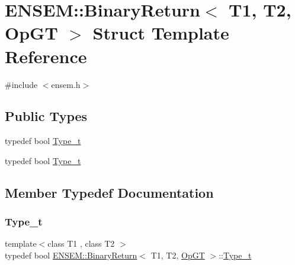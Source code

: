 \hypertarget{structENSEM_1_1BinaryReturn_3_01T1_00_01T2_00_01OpGT_01_4}{}\section{E\+N\+S\+EM\+:\+:Binary\+Return$<$ T1, T2, Op\+GT $>$ Struct Template Reference}
\label{structENSEM_1_1BinaryReturn_3_01T1_00_01T2_00_01OpGT_01_4}


{\ttfamily \#include $<$ensem.\+h$>$}

\subsection*{Public Types}
\begin{DoxyCompactItemize}
\item 
typedef bool \mbox{\hyperlink{structENSEM_1_1BinaryReturn_3_01T1_00_01T2_00_01OpGT_01_4_a421698302c7e07764108c7954de9f1c8}{Type\+\_\+t}}
\item 
typedef bool \mbox{\hyperlink{structENSEM_1_1BinaryReturn_3_01T1_00_01T2_00_01OpGT_01_4_a421698302c7e07764108c7954de9f1c8}{Type\+\_\+t}}
\end{DoxyCompactItemize}


\subsection{Member Typedef Documentation}
\mbox{\label{structENSEM_1_1BinaryReturn_3_01T1_00_01T2_00_01OpGT_01_4_a421698302c7e07764108c7954de9f1c8}} 
\subsubsection{\texorpdfstring{Type\_t}{Type\_t}\hspace{0.1cm}{\footnotesize\ttfamily [1/2]}}
{\footnotesize\ttfamily template$<$class T1 , class T2 $>$ \\
typedef bool \mbox{\hyperlink{structENSEM_1_1BinaryReturn}{E\+N\+S\+E\+M\+::\+Binary\+Return}}$<$ T1, T2, \mbox{\hyperlink{structENSEM_1_1OpGT}{Op\+GT}} $>$\+::\mbox{\hyperlink{structENSEM_1_1BinaryReturn_3_01T1_00_01T2_00_01OpGT_01_4_a421698302c7e07764108c7954de9f1c8}{Type\+\_\+t}}}

